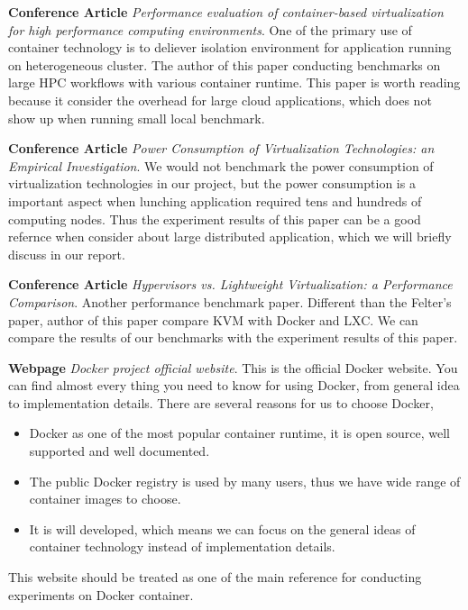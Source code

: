 \documentclass{article}
\begin{document}
\medskip

\textbf{Conference Article} \emph{Performance evaluation of container-based virtualization for 
high performance computing environments}\cite{xavier2013performance}. One of the primary use of
container technology is to deliever isolation environment for application running on heterogeneous 
cluster. The author of this paper conducting benchmarks on large HPC workflows with various 
container runtime. This paper is worth reading because it consider the overhead for large 
cloud applications, which does not show up when running small local benchmark.

\medskip

\textbf{Conference Article} \emph{Power Consumption of Virtualization Technologies: an 
Empirical Investigation}\cite{morabito2015power}. We would not benchmark the power consumption 
of virtualization technologies in our project, but the power consumption is a important 
aspect when lunching application required tens and hundreds of computing nodes. Thus the 
experiment results of this paper can be a good refernce when consider about large distributed
application, which we will briefly discuss in our report.

\medskip

\textbf{Conference Article} \emph{Hypervisors vs. Lightweight Virtualization: a Performance 
Comparison}\cite{morabito2015hypervisors}. Another performance benchmark paper. Different than 
the Felter's paper, author of this paper compare KVM with Docker and LXC. We can compare the 
results of our benchmarks with the experiment results of this paper.

\medskip

\textbf{Webpage} \emph{Docker project official website}\cite{dockerwb}. This is the official 
Docker website. You can find almost every thing you need to know for using Docker, from 
general idea to implementation details.  There are several reasons for us to choose Docker,
\begin{itemize}
    \item Docker as one of the most popular container runtime, it is open source, well supported 
        and well documented.
    \item The public Docker registry is used by many users, thus we have wide range of 
        container images to choose.
    \item It is will developed, which means we can focus on the general ideas of container technology
        instead of implementation details.
\end{itemize}
This website should be treated as one of the main reference for conducting experiments on Docker 
container.
\end{document}
